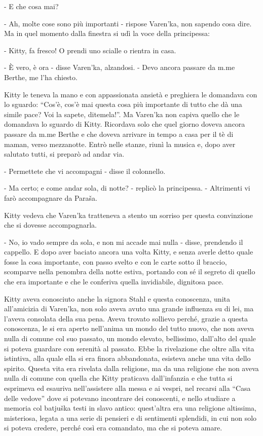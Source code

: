 - E che cosa mai? 

- Ah, molte cose sono più importanti - rispose Varen'ka, non sapendo cosa dire. Ma in quel momento dalla finestra si udì la voce della principessa: 

- Kitty, fa fresco! O prendi uno scialle o rientra in casa. 

- È vero, è ora - disse Varen'ka, alzandosi. - Devo ancora passare da m.me Berthe, me l'ha chiesto. 

Kitty le teneva la mano e con appassionata ansietà e preghiera le domandava con lo sguardo: ``Cos'è, cos'è mai questa cosa più importante di tutto che dà una simile pace? Voi la sapete, ditemela!''. Ma Varen'ka non capiva quello che le domandava lo sguardo di Kitty. Ricordava solo che quel giorno doveva ancora passare da m.me Berthe e che doveva arrivare in tempo a casa per il tè di maman, verso mezzanotte. Entrò nelle stanze, riunì la musica e, dopo aver salutato tutti, si preparò ad andar via. 

- Permettete che vi accompagni - disse il colonnello. 

- Ma certo; e come andar sola, di notte? - replicò la principessa. - Altrimenti vi farò accompagnare da Paraša. 

Kitty vedeva che Varen'ka tratteneva a stento un sorriso per questa convinzione che si dovesse accompagnarla. 

- No, io vado sempre da sola, e non mi accade mai nulla - disse, prendendo il cappello. E dopo aver baciato ancora una volta Kitty, e senza averle detto quale fosse la cosa importante, con passo svelto e con le carte sotto il braccio, scomparve nella penombra della notte estiva, portando con sé il segreto di quello che era importante e che le conferiva quella invidiabile, dignitosa pace. 

Kitty aveva conosciuto anche la signora Stahl e questa conoscenza, unita all'amicizia di Varen'ka, non solo aveva avuto una grande influenza su di lei, ma l'aveva consolata della sua pena. Aveva trovato sollievo perché, grazie a questa conoscenza, le si era aperto nell'anima un mondo del tutto nuovo, che non aveva nulla di comune col suo passato, un mondo elevato, bellissimo, dall'alto del quale si poteva guardare con serenità al passato. Ebbe la rivelazione che oltre alla vita istintiva, alla quale ella si era finora abbandonata, esisteva anche una vita dello spirito. Questa vita era rivelata dalla religione, ma da una religione che non aveva nulla di comune con quella che Kitty praticava dall'infanzia e che tutta si esprimeva ed esauriva nell'assistere alla messa e ai vespri, nel recarsi alla ``Casa delle vedove'' dove si potevano incontrare dei conoscenti, e nello studiare a memoria col batjuška testi in slavo antico: quest'altra era una religione altissima, misteriosa, legata a una serie di pensieri e di sentimenti splendidi, in cui non solo si poteva credere, perché così era comandato, ma che si poteva amare. 

